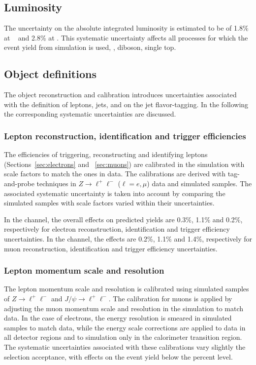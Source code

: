 \subsection{Luminosity}
\label{sec:syst_lumi}
The uncertainty on the absolute integrated luminosity is estimated to be
of 1.8\% at \seventev{}~\cite{lumiunc} and 2.8\% at \eighttev{}. This
systematic uncertainty affects all processes for which the event yield
from simulation is used, \zjets{}, diboson, single top.

\subsection{Object definitions}
\label{sec:syst_objects}
The object reconstruction and calibration introduces uncertainties
associated with the definition of leptons, jets, \met{} and on the jet
flavor-tagging. In the following the corresponding systematic
uncertainties are discussed. 

\subsubsection{Lepton reconstruction, identification and trigger efficiencies}
\label{sec:syst_lepID}

The efficiencies of triggering, reconstructing and identifying leptons
(Sections~\ref{sec:electrons} and ~\ref{sec:muons})
are calibrated in the simulation with scale factors to match the ones
in data. The calibrations are derived with tag-and-probe techniques in
$Z\to \ell^+\ell^-$ ($\ell=e,\mu$) data and simulated samples. The
associated systematic uncertainty is taken into account by
comparing the simulated samples with scale factors varied within their
uncertainties.

In the \ejets{} channel, the overall effects on predicted yields are 0.3\%, 1.1\% 
and 0.2\%, respectively for electron reconstruction, identification
and trigger efficiency uncertainties.
In the \mujets{} channel, the effects are 0.2\%, 1.1\% and 1.4\%,
respectively for muon reconstruction, identification and trigger
efficiency uncertainties.

\subsubsection{Lepton momentum scale and resolution}
\label{sec:lepscale}

The lepton momentum scale and resolution is calibrated using
simulated samples of $Z\to \ell^+\ell^-$ and $J/\psi \to
\ell^+\ell^-$.
The calibration for muons is applied by adjusting the muon momentum
scale and resolution in the simulation to match data. In the case of
electrons, the energy resolution is smeared in simulated samples to
match data, while the energy scale corrections are applied to data in
all detector regions and to simulation only in the calorimeter
transition region. 
The systematic uncertainties associated with these calibrations vary
slightly the selection acceptance, with effects on the event yield
below the percent level.

